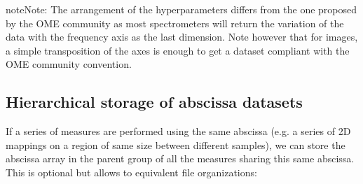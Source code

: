 \documentclass[letterpaper,10pt,english]{sphinxmanual}
\begin{document}
\begin{sphinxadmonition}{note}{Note:}
\sphinxAtStartPar
The arrangement of the hyperparameters differs from the one proposed by the OME community as most spectrometers will return the variation of the data with the frequency axis as the last dimension. Note however that for images, a simple transposition of the axes is enough to get a dataset compliant with the OME community convention.
\end{sphinxadmonition}


\subsection{Hierarchical storage of abscissa datasets}
\label{\detokenize{source/normalization:hierarchical-storage-of-abscissa-datasets}}
\sphinxAtStartPar
If a series of measures are performed using the same abscissa (e.g. a series of 2D mappings on a region of same size between different samples), we can store the abscissa array in the parent group of all the measures sharing this same abscissa. This is optional but allows to equivalent file organizations:
\end{document}
